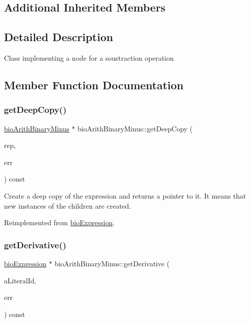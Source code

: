 \subsection*{Additional Inherited Members}


\subsection{Detailed Description}
Class implementing a node for a soustraction operation 

\subsection{Member Function Documentation}
\mbox{\label{classbio_arith_binary_minus_af749ca839d3194cb7bdbf5407d2bb94b}} 
\subsubsection{\texorpdfstring{get\+Deep\+Copy()}{getDeepCopy()}}
{\footnotesize\ttfamily \hyperlink{classbio_arith_binary_minus}{bio\+Arith\+Binary\+Minus} $\ast$ bio\+Arith\+Binary\+Minus\+::get\+Deep\+Copy (\begin{DoxyParamCaption}\item[{\hyperlink{classbio_expression_repository}{bio\+Expression\+Repository} $\ast$}]{rep,  }\item[{pat\+Error $\ast$\&}]{err }\end{DoxyParamCaption}) const\hspace{0.3cm}{\ttfamily [virtual]}}

Create a deep copy of the expression and returns a pointer to it. It means that new instances of the children are created. 

Reimplemented from \hyperlink{classbio_expression_a4ee1b8add634078a02eaae26cd40dcc8}{bio\+Expression}.

\mbox{\label{classbio_arith_binary_minus_a7ccf12cccc95f788423753e7f61fa64f}} 
\subsubsection{\texorpdfstring{get\+Derivative()}{getDerivative()}}
{\footnotesize\ttfamily \hyperlink{classbio_expression}{bio\+Expression} $\ast$ bio\+Arith\+Binary\+Minus\+::get\+Derivative (\begin{DoxyParamCaption}\item[{pat\+U\+Long}]{a\+Literal\+Id,  }\item[{pat\+Error $\ast$\&}]{err }\end{DoxyParamCaption}) const\hspace{0.3cm}{\ttfamily [virtual]}}

